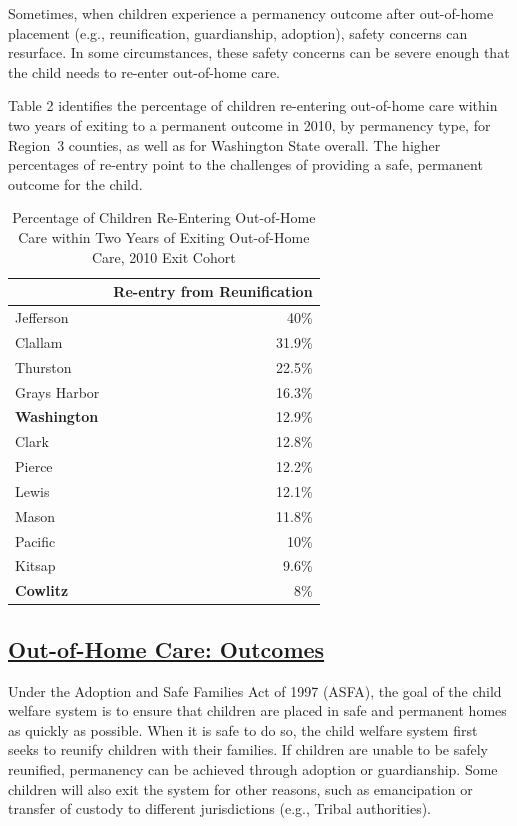 \documentclass{article}\usepackage[]{graphicx}\usepackage[]{color}
\begin{document}
Sometimes, when children experience a permanency outcome after out-of-home placement (e.g., reunification, guardianship, adoption), safety concerns can resurface. In some circumstances, these safety concerns can be severe enough that the child needs to re-enter out-of-home care.

Table 2 identifies the percentage of children re-entering out-of-home care within two years of exiting to a permanent outcome in 2010, by permanency type, for Region~3 counties, as well as for Washington State overall. The higher percentages of re-entry point to the challenges of providing a safe, permanent outcome for the child.
\vspace{12pt}
\nopagebreak[3]
\begin{table}[ht]
\centering
\caption{Percentage of Children Re-Entering Out-of-Home Care within Two Years of Exiting Out-of-Home Care, 2010 Exit Cohort} 
\begin{tabular}{lr}
  \toprule
 & Re-entry from Reunification \\ 
  \midrule
Jefferson & 40\% \\ 
  Clallam & 31.9\% \\ 
  Thurston & 22.5\% \\ 
  Grays Harbor & 16.3\% \\ 
  \textbf{Washington} & 12.9\% \\ 
  Clark & 12.8\% \\ 
  Pierce & 12.2\% \\ 
  Lewis & 12.1\% \\ 
  Mason & 11.8\% \\ 
  Pacific & 10\% \\ 
  Kitsap & 9.6\% \\ 
  \textbf{Cowlitz} & 8\% \\ 
   \bottomrule
\end{tabular}
\end{table}



\newpage

\subsection{\href{http://www.partnersforourchildren.org/child-well-being/visualizations/out-home-care/outcomes}
    {Out-of-Home Care: Outcomes}
}
Under the Adoption and Safe Families Act of 1997 (ASFA), the goal of the child welfare system is to ensure that children are placed in safe and permanent homes as quickly as possible. When it is safe to do so, the child welfare system first seeks to reunify children with their families. If children are unable to be safely reunified, permanency can be achieved through adoption or guardianship. Some children will also exit the system for other reasons, such as emancipation or transfer of custody to different jurisdictions (e.g., Tribal authorities).
\end{document}
